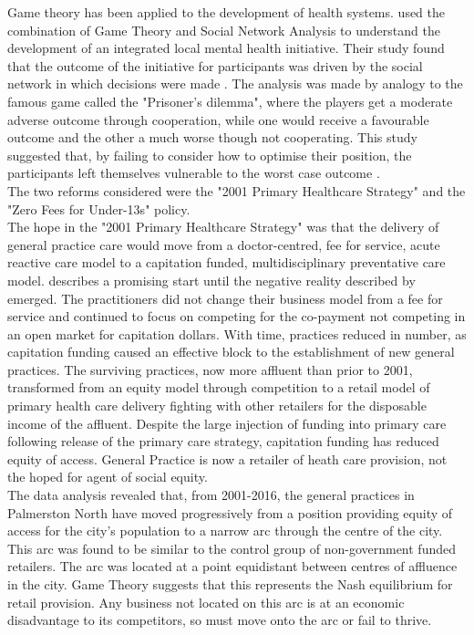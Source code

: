\documentclass[11pt,a4paper]{article}
\begin{document}
Game theory has been applied to the development of health systems. \citet{dobson2004sustainable} used the combination of Game Theory and Social Network Analysis to understand the development of an integrated local mental health initiative. Their study found that the outcome of the initiative for participants was driven by the social network in which decisions were made \citep{dobson2004sustainable}. The analysis was made by analogy to the famous game called the "Prisoner's dilemma", where the players get a moderate adverse outcome through cooperation, while one would receive a favourable outcome and the other a much worse though not cooperating. This study suggested that, by failing to consider how to optimise their position, the participants left themselves vulnerable to the worst case outcome \citep{dobson2004sustainable}. \\


The two reforms considered were the "2001 Primary Healthcare Strategy" \citep{king2001primary} and the "Zero Fees for Under-13s" policy\citep{frizelle2014health}.\\


The hope in the "2001 Primary Healthcare Strategy" \citep{king2001primary} was that the delivery of general practice care would move from a doctor-centred, fee for service, acute reactive care model to a capitation funded, multidisciplinary preventative care model. \citet{hefford2005reducing} describes a promising start until the negative reality described by \citet{howell2005restructuring} emerged. The practitioners did not change their business model from a fee for service and continued to focus on competing for the co-payment not competing in an open market for capitation dollars. With time, practices reduced in number, as capitation funding caused an effective block to the establishment of new general practices. The surviving practices, now more affluent than prior to 2001, transformed from an equity model through competition to a retail model of primary health care delivery fighting with other retailers for the disposable income of the affluent. Despite the large injection of funding into primary care following release of the primary care strategy, capitation funding has reduced equity of access. General Practice is now a retailer of heath care provision, not the hoped for agent of social equity.\\


The data analysis revealed that, from 2001-2016, the general practices in Palmerston North have moved progressively  from a position providing equity of access for the city's population to a narrow arc through the centre of the city. This arc was found to be similar to the control group of non-government funded retailers. The arc was located at a point equidistant between centres of affluence in the city. Game Theory suggests that this represents the Nash equilibrium for retail provision. Any business not located on this arc is at an economic disadvantage to its competitors, so must move onto the arc or fail to thrive.\\
\end{document}
